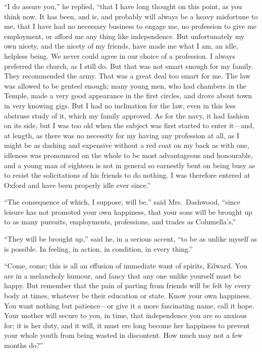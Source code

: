 ``I do assure you,'' he replied, ``that I have long
thought on this point, as you think now.  It has been,
and is, and probably will always be a heavy misfortune
to me, that I have had no necessary business to engage me,
no profession to give me employment, or afford me any
thing like independence.  But unfortunately my own nicety,
and the nicety of my friends, have made me what I am,
an idle, helpless being.  We never could agree in our
choice of a profession.  I always preferred the church,
as I still do.  But that was not smart enough for my family.
They recommended the army.  That was a great deal
too smart for me.  The law was allowed to be genteel
enough; many young men, who had chambers in the Temple,
made a very good appearance in the first circles,
and drove about town in very knowing gigs.  But I had
no inclination for the law, even in this less abstruse
study of it, which my family approved.  As for the navy,
it had fashion on its side, but I was too old when the
subject was first started to enter it---and, at length,
as there was no necessity for my having any profession
at all, as I might be as dashing and expensive without
a red coat on my back as with one, idleness was pronounced
on the whole to be most advantageous and honourable,
and a young man of eighteen is not in general so earnestly
bent on being busy as to resist the solicitations of his
friends to do nothing.  I was therefore entered at Oxford
and have been properly idle ever since.''

``The consequence of which, I suppose, will be,''
said Mrs.\ Dashwood, ``since leisure has not promoted
your own happiness, that your sons will be brought up
to as many pursuits, employments, professions, and trades
as Columella's.''

``They will be brought up,'' said he, in a serious accent,
``to be as unlike myself as is possible.  In feeling,
in action, in condition, in every thing.''

``Come, come; this is all an effusion of immediate
want of spirits, Edward.  You are in a melancholy humour,
and fancy that any one unlike yourself must be happy.
But remember that the pain of parting from friends
will be felt by every body at times, whatever be their
education or state.  Know your own happiness.  You want
nothing but patience---or give it a more fascinating name,
call it hope.  Your mother will secure to you, in time,
that independence you are so anxious for; it is her duty,
and it will, it must ere long become her happiness to
prevent your whole youth from being wasted in discontent.
How much may not a few months do?''

